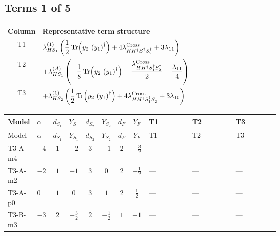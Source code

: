 \documentclass[8pt]{article}
\begin{document}
\begin{landscape}
\subsection*{Terms 1 of 5}
\begin{center}
\begin{tabular}{@{}c >{\raggedright\arraybackslash}p{0.82\linewidth}@{}}
\toprule
Column & Representative term structure \\
\midrule
T1 & \(\displaystyle {\lambda_{HS_1}^{(1)}} \left(\frac{1}{2} \operatorname{Tr}\!\left({y_2}\,\left({y_1}\right)^{\dagger}\right)+4 {\lambda_{H H^\dagger S_1^\dagger S_2^\dagger}^{\rm Cross}}+3 {\lambda_{11}}\right)\) \\
\midrule
T2 & \(\displaystyle +{\lambda_{HS_1}^{(A)}} \left(-\frac{1}{8} \operatorname{Tr}\!\left({y_2}\,\left({y_1}\right)^{\dagger}\right)-\frac{{\lambda_{H H^\dagger S_1^\dagger S_2^\dagger}^{\rm Cross}}}{2}-\frac{{\lambda_{11}}}{4}\right)\) \\
\midrule
T3 & \(\displaystyle +{\lambda_{HS_2}^{(1)}} \left(\frac{1}{2} \operatorname{Tr}\!\left({y_2}\,\left({y_1}\right)^{\dagger}\right)+4 {\lambda_{H H^\dagger S_1^\dagger S_2^\dagger}^{\rm Cross}}+3 {\lambda_{10}}\right)\) \\
\midrule
\bottomrule
\end{tabular}
\end{center}
\smallskip
\tiny
\begin{longtable}{@{}llcccccc >{\raggedright\arraybackslash}p{0.21\linewidth} >{\raggedright\arraybackslash}p{0.21\linewidth} >{\raggedright\arraybackslash}p{0.21\linewidth}@{}}
\toprule
Model & $\alpha$ & $d_{S_1}$ & $Y_{S_1}$ & $d_{S_2}$ & $Y_{S_2}$ & $d_F$ & $Y_F$ & T1 & T2 & T3 \\
\midrule
\endfirsthead
\toprule
Model & $\alpha$ & $d_{S_1}$ & $Y_{S_1}$ & $d_{S_2}$ & $Y_{S_2}$ & $d_F$ & $Y_F$ & T1 & T2 & T3 \\
\midrule
\endhead
T3-A-m4 & $-4$ & $1$ & $-2$ & $3$ & $-1$ & $2$ & $-\frac{3}{2}$ & --- & --- & --- \\
\midrule
T3-A-m2 & $-2$ & $1$ & $-1$ & $3$ & $0$ & $2$ & $-\frac{1}{2}$ & --- & --- & --- \\
\midrule
T3-A-p0 & $0$ & $1$ & $0$ & $3$ & $1$ & $2$ & $\frac{1}{2}$ & --- & --- & --- \\
\midrule
T3-B-m3 & $-3$ & $2$ & $-\frac{3}{2}$ & $2$ & $-\frac{1}{2}$ & $1$ & $-1$ & --- & --- & --- \\
\midrule

\end{longtable}
\end{landscape}
\end{document}
